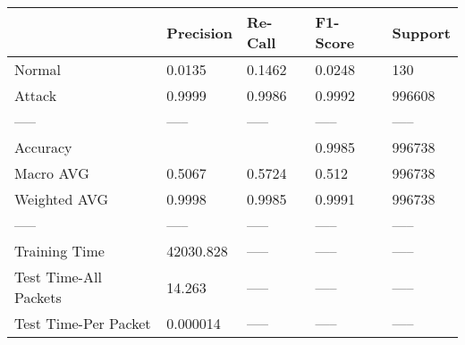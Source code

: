 \begin{tabular}{lllll}
\toprule
{} &  Precision & Re-Call & F1-Score & Support \\
\midrule
Normal                &     0.0135 &  0.1462 &   0.0248 &     130 \\
Attack                &     0.9999 &  0.9986 &   0.9992 &  996608 \\
-----                 &      ----- &   ----- &    ----- &   ----- \\
Accuracy              &            &         &   0.9985 &  996738 \\
Macro AVG             &     0.5067 &  0.5724 &    0.512 &  996738 \\
Weighted AVG          &     0.9998 &  0.9985 &   0.9991 &  996738 \\
-----                 &      ----- &   ----- &    ----- &   ----- \\
Training Time         &  42030.828 &   ----- &    ----- &   ----- \\
Test Time-All Packets &     14.263 &   ----- &    ----- &   ----- \\
Test Time-Per Packet  &   0.000014 &   ----- &    ----- &   ----- \\
\bottomrule
\end{tabular}
